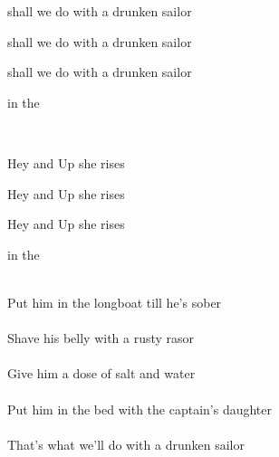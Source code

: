 \begin{SBVerse*}
 shall we do with a drunken sailor

 shall we do with a drunken sailor

 shall we do with a drunken sailor

 in the 
\end{SBVerse*}
~\\
\begin{SBChorus}
 Hey and Up she rises

 Hey and Up she rises

 Hey and Up she rises

 in the 
\end{SBChorus}
~\\
Put him in the longboat till he's sober\\
~\\
Shave his belly with a rusty rasor\\
~\\
Give him a dose of salt and water\\
~\\
Put him in the bed with the captain's daughter\\
~\\
That's what we'll do with a drunken sailor\\

